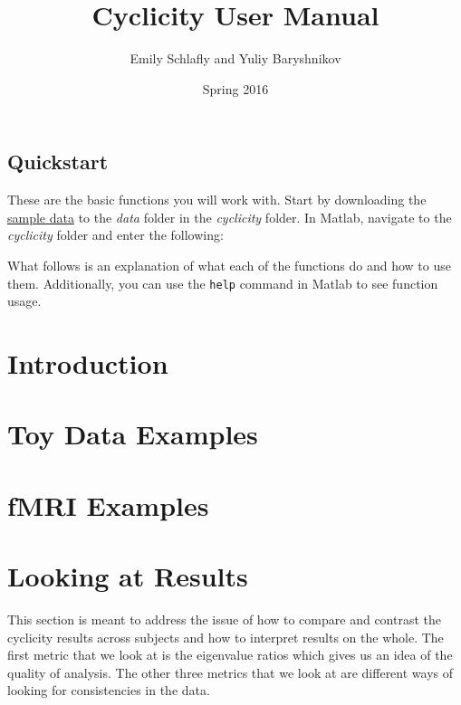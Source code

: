 \documentclass[11pt]{article}
\title{Cyclicity User Manual}
\author{Emily Schlafly and Yuliy Baryshnikov}
\date{Spring 2016}
\begin{document}
\maketitle

{\hypersetup{linkcolor=black}
\tableofcontents
}

\setlength{\parskip}{1em}

\pagebreak

\begin{mdframed}
\section{Quickstart}

These are the basic functions you will work with. Start by downloading the \href{https://uofi.box.com/s/k3wci00baw39axgz3070c8325ej601io}{sample data} to the \textit{data} folder in the \textit{cyclicity} folder. In Matlab, navigate to the \textit{cyclicity} folder and enter the following: 



What follows is an explanation of what each of the functions do and how to use them. Additionally, you can use the \verb|help| command in Matlab to see function usage.

\end{mdframed}

\pagebreak

\section{Introduction}


\section{Toy Data Examples}


\section{fMRI Examples}


\section{Looking at Results}
This section is meant to address the issue of how to compare and contrast the cyclicity results across subjects and how to interpret results on the whole. The first metric that we look at is the eigenvalue ratios which gives us an idea of the quality of analysis. The other three metrics that we look at are different ways of looking for consistencies in the data.
\end{document}
